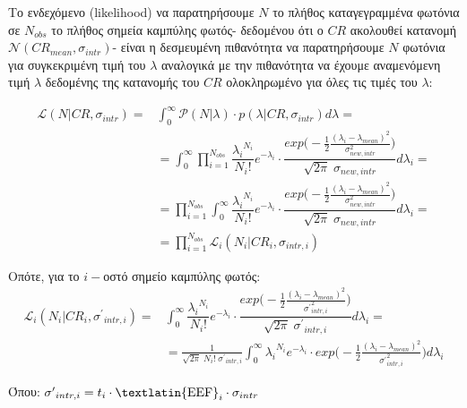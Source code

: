 Το ενδεχόμενο (\textlatin{likelihood}) να παρατηρήσουμε $N$ το πλήθος καταγεγραμμένα φωτόνια σε $N_{obs}$ το πλήθος σημεία καμπύλης φωτός- δεδομένου ότι ο $CR$ ακολουθεί κατανομή $\mathcal{N}(CR_{mean}, \sigma_{intr})$-  είναι η δεσμευμένη πιθανότητα να παρατηρήσουμε $N$ φωτόνια για συγκεκριμένη τιμή του $\lambda$ αναλογικά με την πιθανότητα να έχουμε αναμενόμενη τιμή $\lambda$ δεδομένης της κατανομής του $CR$ ολοκληρωμένο για όλες τις τιμές του  $\lambda$:

\begin{equation}\begin{aligned} \mathcal{L} (N|CR, \sigma_{intr})= {} &  \int_0^\infty \mathcal{P}(N|\lambda) \cdot  {p} (\lambda|CR, \sigma_{intr}) d\lambda    =\\ & =    \int_0^\infty  \prod_{i=1}^{N_{obs}} \dfrac{{\lambda_i}^{N_i}}{N_i !} e^{-\lambda_i}  \cdot   \dfrac{exp \big(-\frac{1}{2} \frac{( \lambda_i-\lambda_{mean} )^2}{\sigma_{new, intr}^2}  \big)} {\sqrt{2\pi}\; \sigma_{new, intr}}  d\lambda_i =    \\ & =  \prod_{i=1}^{N_{obs}} \int_0^\infty   \dfrac{{\lambda_i}^{N_i}}{N_i !} e^{-\lambda_i}  \cdot   \dfrac{exp \big(-\frac{1}{2} \frac{( \lambda_i-\lambda_{mean} )^2}{\sigma_{new, intr}^2}  \big)} {\sqrt{2\pi} \; \sigma_{new, intr}}  d\lambda_i =    \\ & =  \prod_{i=1}^{N_{obs}} \mathcal{L}_i (N_i|CR_i, \sigma_{intr, i})  \label{eq:Likelihood_tot}\end{aligned}\end{equation}

Οπότε, για το $i-$οστό σημείο καμπύλης φωτός:
\begin{equation}\begin{aligned} \mathcal{L}_i (N_i|CR_i, {\sigma^\prime}_{ intr, i}) = {} &  \int_0^\infty   \dfrac{{\lambda_i}^{N_i}}{N_i !} e^{-\lambda_i}  \cdot   \dfrac{exp \big(-\frac{1}{2} \frac{( \lambda_i-\lambda_{mean} )^2}{{\sigma^\prime}_{ intr, i}^2}  \big)} {\sqrt{2\pi} \; {\sigma^\prime}_{ intr, i}}  d\lambda_i =    \\ & =  \frac{1}{\sqrt{2\pi} \; N_i! \; {\sigma^\prime}_{ intr, i} } \int_0^\infty  {\lambda_i}^{N_i} e^{-\lambda_i} \cdot exp \Big(-\frac{1}{2} \frac{( \lambda_i-\lambda_{mean} )^2}{{\sigma^\prime}_{ intr, i}^2}  \Big) d\lambda_i  \label{eq:Likelihood_i}\end{aligned}\end{equation}

Όπου: ${\sigma^\prime}_{ intr, i} = t_i \cdot \mbox{\textlatin{EEF}}_i \cdot \sigma_{intr} $

